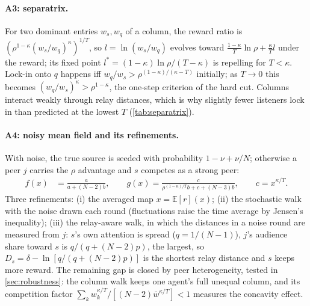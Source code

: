 \paragraph{A3: separatrix.} For two dominant entries $w_s,w_q$ of a column, the reward ratio is
$(\rho^{1-\kappa}(w_s/w_q)^\kappa)^{1/T}$, so $l=\ln(w_s/w_q)$ evolves toward $\frac{1-\kappa}{T}\ln\rho+\frac{\kappa}{T}l$
under the reward; its fixed point $l^*=(1-\kappa)\ln\rho/(T-\kappa)$ is repelling for $T<\kappa$. Lock-in onto $q$ happens
iff $w_q/w_s>\rho^{(1-\kappa)/(\kappa-T)}$ initially; as $T\to0$ this becomes $(w_q/w_s)^\kappa>\rho^{1-\kappa}$, the
one-step criterion of the hard cut. Columns interact weakly through relay distances, which is why slightly fewer
listeners lock in than predicted at the lowest $T$ (\cref{tab:separatrix}).

\paragraph{A4: noisy mean field and its refinements.} With noise, the true source is seeded with probability
$1-\nu+\nu/N$; otherwise a peer $j$ carries the $\rho$ advantage and $s$ competes as a strong peer:
\begin{align}
  f(x)&=\frac{a}{a+(N-2)b},\qquad g(x)=\frac{c}{\rho^{(1-\kappa)/T}b+c+(N-3)b},\qquad c=x^{\kappa/T}.
\end{align}
Three refinements: (i) the averaged map $x=\mathbb E[r](x)$; (ii) the stochastic walk with the noise drawn each round
(fluctuations raise the time average by Jensen's inequality); (iii) the relay-aware walk, in which the distances in a
noise round are measured from $j$: $s$'s own attention is spread ($q=1/(N-1)$), $j$'s audience share toward $s$ is
$q/(q+(N-2)p)$, the largest, so $D_s=\delta-\ln[q/(q+(N-2)p)]$ is the shortest relay distance and $s$ keeps more reward.
The remaining gap is closed by peer heterogeneity, tested in \cref{sec:robustness}: the column walk keeps one agent's
full unequal column, and its competition factor $\sum_kw_k^{\kappa/T}/[(N-2)\bar w^{\kappa/T}]<1$ measures the concavity
effect.
